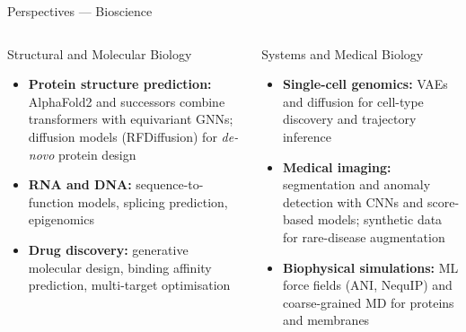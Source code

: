 \documentclass[aspectratio=169,11pt]{beamer}
\begin{document}
\begin{frame}{Perspectives --- Bioscience}
  \begin{columns}[T]
      \begin{block}{Structural and Molecular Biology}
        \begin{itemize}\itemsep2pt
          \item \textbf{Protein structure prediction:}
                AlphaFold2 and successors combine
                transformers with equivariant GNNs;
                diffusion models (RFDiffusion) for
                \emph{de-novo} protein design
          \item \textbf{RNA and DNA:}
                sequence-to-function models,
                splicing prediction, epigenomics
          \item \textbf{Drug discovery:}
                generative molecular design,
                binding affinity prediction,
                multi-target optimisation
        \end{itemize}
      \end{block}
      \begin{block}{Systems and Medical Biology}
        \begin{itemize}\itemsep2pt
          \item \textbf{Single-cell genomics:}
                VAEs and diffusion for cell-type
                discovery and trajectory inference
          \item \textbf{Medical imaging:}
                segmentation and anomaly detection
                with CNNs and score-based models;
                synthetic data for rare-disease
                augmentation
          \item \textbf{Biophysical simulations:}
                ML force fields (ANI, NequIP)
                and coarse-grained MD for proteins
                and membranes
        \end{itemize}
      \end{block}
  \end{columns}
\end{frame}
\end{document}
